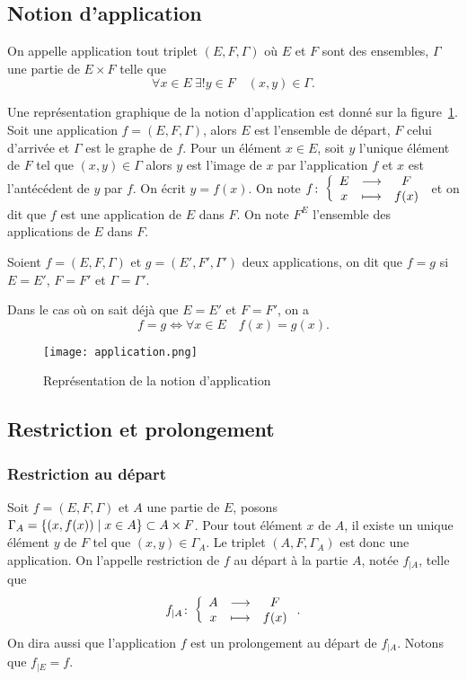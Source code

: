 \subsection{Notion d'application}
\label{chap3-subsec:notiondapplication}
\begin{defdef}
  On appelle application tout triplet \((E, F, \Gamma)\) où \(E\) et \(F\) sont des ensembles, \(\Gamma\) une partie de \(E \times F\) telle que 
  \begin{equation}
    \forall x \in E \ \exists! y \in F \quad (x,y) \in \Gamma.
  \end{equation}
\end{defdef}
Une représentation graphique de la notion d'application est donné sur la figure~\ref{chap3-fig:application}. Soit une
application \(f=(E,F,\Gamma)\), alors \(E\) est l'ensemble de départ, \(F\) celui d'arrivée et \(\Gamma\) est le graphe de \(f\).
Pour un élément \(x \in E\), soit \(y\) l'unique élément de \(F\) tel que \((x,y) \in \Gamma\) alors \(y\) est l'image de \(x\) par
l'application \(f\) et \(x\) est l'antécédent de \(y\) par \(f\). On écrit \(y=f(x)\). On note \(f\colon \left\{\begin{array}{ccc} E & \longrightarrow &F\\ x & \longmapsto & f(x) \end{array} \right.\) et on dit que \(f\) est une application de \(E\) dans \(F\). On note \(F^E\) l'ensemble des applications de \(E\) dans \(F\).
%
\begin{defdef}
  Soient \(f=(E,F,\Gamma)\) et \(g=(E',F',\Gamma')\) deux applications, on dit que \(f=g\) si \(E=E'\), \(F=F'\) et \(\Gamma=\Gamma'\).
\end{defdef}
Dans le cas où on sait déjà que \(E=E'\) et \(F=F'\), on a
\begin{equation}
  f=g \iff \forall x \in E \quad f(x)=g(x).
\end{equation}
%
\begin{figure}
  \centering
  \texttt{[image: application.png]}
  \caption{Représentation de la notion d'application}
  \label{chap3-fig:application}
\end{figure}
%
\subsection{Restriction et prolongement}
\label{chap3-restrictionetprolongement}
\subsubsection{Restriction au départ} 
\label{chap3-subsubsec:restrictiondep}
Soit \(f=(E,F,\Gamma)\) et \(A\) une partie de \(E\), posons \(\Gamma_A=\left\{(x,f(x))\mathrel{}\middle|\mathrel{}x \in A\right\} \subset A \times F\). Pour
tout élément \(x\) de \(A\), il existe un unique élément \(y\) de \(F\) tel que \((x,y) \in \Gamma_A\). Le triplet \((A,F, \Gamma_A)\) est donc une application. On l'appelle restriction de \(f\) au départ à la partie \(A\), notée \(f_{|A}\), telle que
\begin{equation}
f_{|A}\colon \left\{\begin{array}{ccc} A & \longrightarrow &F\\ x & \longmapsto & f(x) \end{array} \right..
\end{equation}
On dira aussi que l'application \(f\) est un prolongement au départ de \(f_{|A}\). Notons que \(f_{|E}=f\).
%
